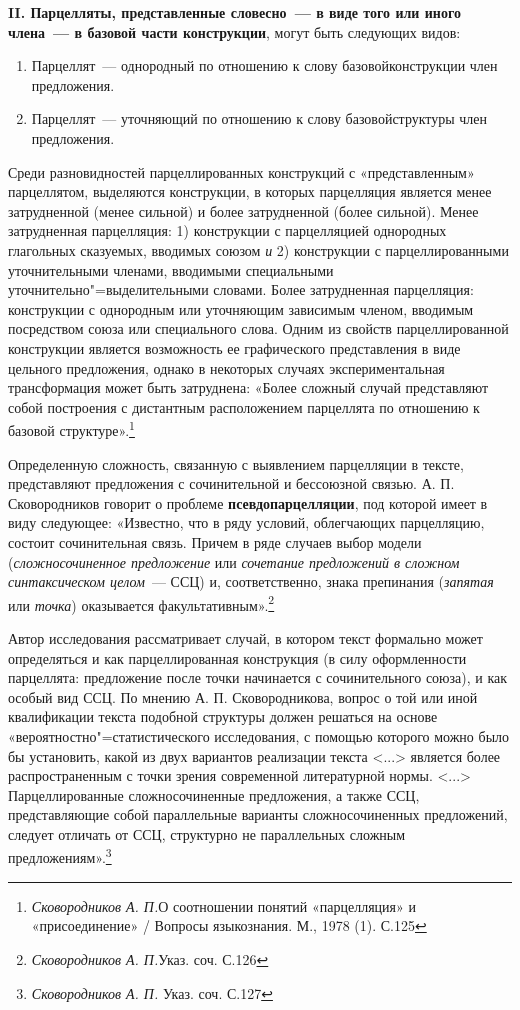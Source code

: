 \documentclass{kursa4}
\begin{document}
      \textbf{II. Парцелляты, представленные словесно~--- в виде того или иного члена~--- в базовой части конструкции}, могут быть следующих видов: \begin{enumerate}
        \item {Парцеллят~--- однородный по отношению к слову базовой}{конструкции член предложения.}
        \item {Парцеллят~--- уточняющий по отношению к слову базовой}{структуры член предложения.}
      \end{enumerate}

      Среди разновидностей парцеллированных конструкций с «представленным» парцеллятом, выделяются конструкции, в которых парцелляция является менее затрудненной (менее сильной) и более затрудненной (более сильной). Менее затрудненная парцелляция: 1) конструкции с парцелляцией однородных глагольных сказуемых, вводимых союзом \textit{и }2) конструкции с парцеллированными уточнительными членами, вводимыми специальными уточнительно"=выделительными словами. Более затрудненная парцелляция: конструкции с однородным или уточняющим зависимым членом, вводимым посредством союза или специального слова. Одним из свойств парцеллированной конструкции является возможность ее графического представления в виде цельного предложения, однако в некоторых случаях экспериментальная трансформация может быть затруднена: «Более сложный случай представляют собой построения с дистантным расположением парцеллята по отношению к базовой структуре».\footnote{\textit{{ Сковородников А. П.}}{О соотношении понятий «парцелляция» и «присоединение» / Вопросы языкознания. М., 1978 (1). С.125}}

      Определенную сложность, связанную с выявлением парцелляции в тексте, представляют предложения с сочинительной и бессоюзной связью. А. П. Сковородников говорит о проблеме \textbf{псевдопарцелляции}, под которой имеет в виду следующее: «Известно, что в ряду условий, облегчающих парцелляцию, состоит сочинительная связь. Причем в ряде случаев выбор модели (\textit{сложносочиненное предложение} или \textit{сочетание предложений в сложном синтаксическом целом}{~--- ССЦ) и, соответственно, знака препинания (}\textit{запятая} или \textit{точка}) оказывается факультативным».\footnote{\textit{Сковородников А. П.}{Указ. соч. С.126}}

      Автор исследования рассматривает случай, в котором текст формально может определяться и как парцеллированная конструкция (в силу оформленности парцеллята: предложение после точки начинается с сочинительного союза), и как особый вид ССЦ. По мнению А. П. Сковородникова, вопрос о той или иной квалификации текста подобной структуры должен решаться на основе «вероятностно"=статистического исследования, с помощью которого можно было бы установить, какой из двух вариантов реализации текста \textless{}...\textgreater{} является более распространенным с точки зрения современной литературной нормы. \textless{}...\textgreater{} Парцеллированные сложносочиненные предложения, а также ССЦ, представляющие собой параллельные варианты сложносочиненных предложений, следует отличать от
      {ССЦ, структурно не параллельных сложным предложениям}{».}\footnote{\textit{{ Сковородников А. П. }}{Указ. соч. С.127}}{ }
\end{document}
